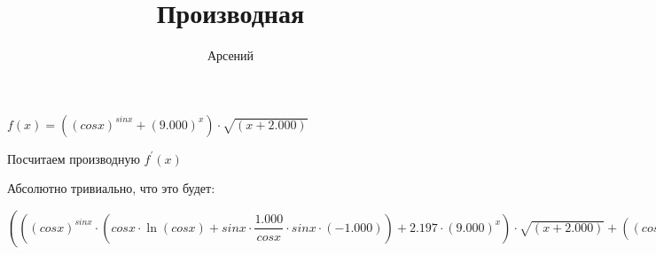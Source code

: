 \documentclass[a4paper,12pt]{article}
\author{\LARGEМерзляков Арсений}
\title{Производная}
\begin{document}
\maketitle
\begin{flushleft}
\Large
$f(x) = ((cosx)^{sinx}+(9.000)^{x}) \cdot \sqrt{(x+2.000)}$

Посчитаем производную $f^{'}(x)$

Абсолютно тривиально, что это будет:

$(((cosx)^{sinx} \cdot (cosx \cdot \ln{(cosx)}+sinx \cdot  \dfrac{1.000}{cosx}  \cdot sinx \cdot (-1.000))+2.197 \cdot (9.000)^{x}) \cdot \sqrt{(x+2.000)}+((cosx)^{sinx}+(9.000)^{x}) \cdot  \dfrac{1.000}{2.000 \cdot \sqrt{(x+2.000)}} )$

\end{flushleft}
\end{document}
